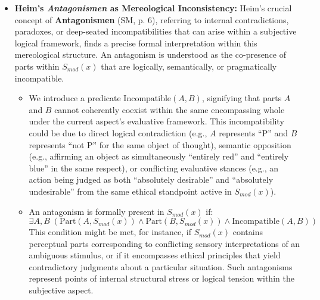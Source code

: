 \documentclass[
    12pt,              %
    a4paper,           %
    headings=normal,   %
    twoside=true,      %
    BCOR=8mm,          %
]{scrbook}
\newcommand{\q}[1]{\enquote{#1}}
\begin{document}
\begin{itemize}
\begin{enumerate}[label=(\alph*)]
                \begin{itemize}
                    \item   \textbf{Axiom (MSL-M2: Coordinated Parthood):} For any \(k_{coord} \in K_{mod}(x)\) (where \(K_{mod}(x)\) is the set of all such actively coordinated pairs in \(S_{mod}(x)\)), it holds that \(\text{Part}(k_{coord}, S_{mod}(x))\). Furthermore, the elemental evaluated predicate and qualifier forming \(k_{coord}\) are parts of \(k_{coord}\): \(\text{Part}((f_q, v_{fq}), k_{coord})\) and \(\text{Part}((d_r, v_{dq}), k_{coord})\).
                \end{itemize}
        \end{enumerate}

    \item   \textbf{Heim’s \textit{Antagonismen} as Mereological Inconsistency:}
        Heim's crucial concept of \textbf{Antagonismen} (SM, p. 6), referring to internal contradictions, paradoxes, or deep-seated incompatibilities that can arise within a subjective logical framework, finds a precise formal interpretation within this mereological structure. An antagonism is understood as the co-presence of parts within \(S_{mod}(x)\) that are logically, semantically, or pragmatically incompatible.
        \begin{itemize}
            \item   We introduce a predicate \(\text{Incompatible}(A,B)\), signifying that parts \(A\) and \(B\) cannot coherently coexist within the same encompassing whole under the current aspect's evaluative framework. This incompatibility could be due to direct logical contradiction (e.g., \(A\) represents \q{P} and \(B\) represents \q{not P} for the same object of thought), semantic opposition (e.g., affirming an object as simultaneously \q{entirely red} and \q{entirely blue} in the same respect), or conflicting evaluative stances (e.g., an action being judged as both \q{absolutely desirable} and \q{absolutely undesirable} from the same ethical standpoint active in \(S_{mod}(x)\)).
            \item   An antagonism is formally present in \(S_{mod}(x)\) if:
                \[ \exists A, B \; (\text{Part}(A, S_{mod}(x)) \land \text{Part}(B, S_{mod}(x)) \land \text{Incompatible}(A,B)) \]
                This condition might be met, for instance, if \(S_{mod}(x)\) contains perceptual parts corresponding to conflicting sensory interpretations of an ambiguous stimulus, or if it encompasses ethical principles that yield contradictory judgments about a particular situation. Such antagonisms represent points of internal structural stress or logical tension within the subjective aspect.
        \end{itemize}


\end{itemize}
\end{document}
